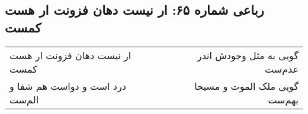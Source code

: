 \begin{center}
\section*{رباعی شماره ۶۵: ار نیست دهان فزونت ار هست کمست}
\label{sec:sh065}
\begin{longtable}{l p{0.5cm} r}
ار نیست دهان فزونت ار هست کمست
&&
گویی به مثل وجودش اندر عدم‌ست
\\
درد است و دواست هم شفا و الم‌ست
&&
گویی ملک الموت و مسیحا بهم‌ست
\\
\end{longtable}
\end{center}
